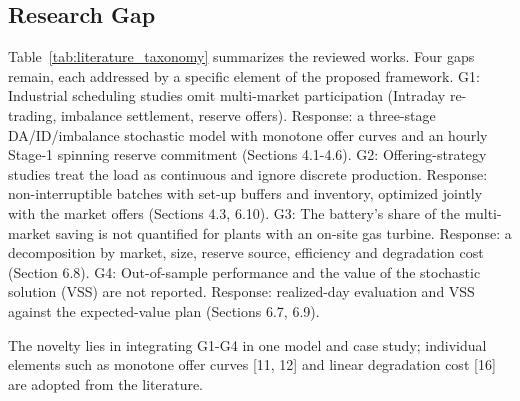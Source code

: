 \documentclass[5p,times,twocolumn]{elsarticle}
\begin{document}
\subsection{Research Gap}
Table~\ref{tab:literature_taxonomy} summarizes the reviewed works. Four gaps remain, each addressed by a specific element of the proposed framework.
G1: Industrial scheduling studies omit multi-market participation (Intraday re-trading, imbalance settlement, reserve offers). Response: a three-stage DA/ID/imbalance stochastic model with monotone offer curves and an hourly Stage-1 spinning reserve commitment (Sections 4.1-4.6).
G2: Offering-strategy studies treat the load as continuous and ignore discrete production. Response: non-interruptible batches with set-up buffers and inventory, optimized jointly with the market offers (Sections 4.3, 6.10).
G3: The battery’s share of the multi-market saving is not quantified for plants with an on-site gas turbine. Response: a decomposition by market, size, reserve source, efficiency and degradation cost (Section 6.8).
G4: Out-of-sample performance and the value of the stochastic solution (VSS) are not reported. Response: realized-day evaluation and VSS against the expected-value plan (Sections 6.7, 6.9).

The novelty lies in integrating G1-G4 in one model and case study; individual elements such as monotone offer curves [11, 12] and linear degradation cost [16] are adopted from the literature.
\end{document}
